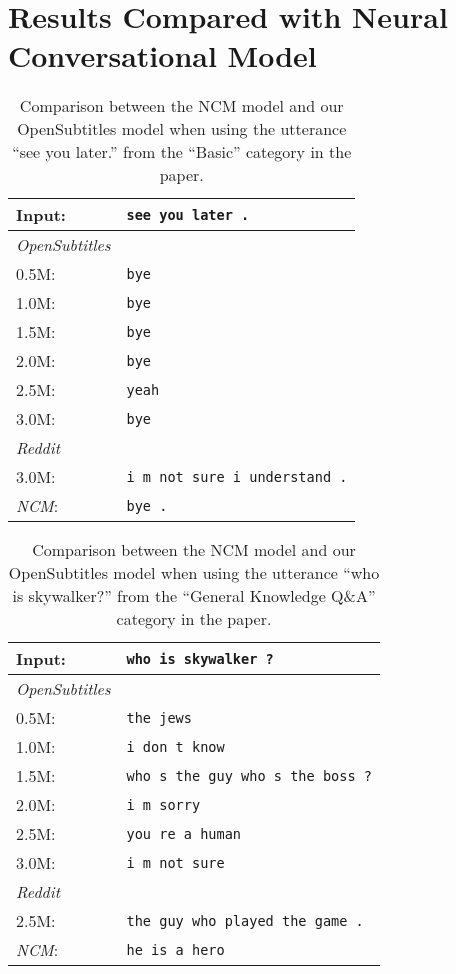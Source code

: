 \chapter{Results Compared with Neural Conversational Model}
\label{apendix:results:compared_with_NCM}
\begin{table}[H]
	\centering
	\begin{adjustbox}{max width=\textwidth}
		\begin{tabularx}{\textwidth}{lX}
			\toprule
			Input: 	& \texttt{see you later .}\\
			\midrule
			\emph{OpenSubtitles}\\
			0.5M: 	& \texttt{bye}\\
			1.0M: 	& \texttt{bye}\\
			1.5M:	& \texttt{bye}\\
			2.0M:	& \texttt{bye}\\
			2.5M:	& \texttt{yeah}\\
			3.0M:	& \texttt{bye}\\
			\midrule
			\emph{Reddit}\\
			3.0M:	& \texttt{i m not sure i understand .}\\
			\midrule
			\emph{NCM}:	& \texttt{bye .}\\
			\bottomrule
		\end{tabularx}
	\end{adjustbox}
	\caption{Comparison between the NCM model and our OpenSubtitles model when using the utterance ``see you later.'' from the ``Basic'' category in the paper.}
	\label{results:example15_output:Neural_Conversational_Model_compared}
\end{table}

\begin{table}[H]
	\centering
	\begin{adjustbox}{max width=\textwidth}
		\begin{tabularx}{\textwidth}{lX}
			\toprule
			Input: 	& \texttt{who is skywalker ?}\\
			\midrule
			\emph{OpenSubtitles}\\
			0.5M: 	& \texttt{the jews}\\
			1.0M: 	& \texttt{i don t know}\\
			1.5M:	& \texttt{who s the guy who s the boss ?}\\
			2.0M:	& \texttt{i m sorry}\\
			2.5M:	& \texttt{you re a human}\\
			3.0M:	& \texttt{i m not sure}\\
			\midrule
			\emph{Reddit}\\
			2.5M:	& \texttt{the guy who played the game .}\\
			\midrule
			\emph{NCM}:	& \texttt{he is a hero }\\
			\bottomrule
		\end{tabularx}
	\end{adjustbox}
	\caption{Comparison between the NCM model and our OpenSubtitles model when using the utterance ``who is skywalker?'' from the ``General Knowledge Q\&A'' category in the paper.}
	\label{results:example16_output:Neural_Conversational_Model_compared}
\end{table}

